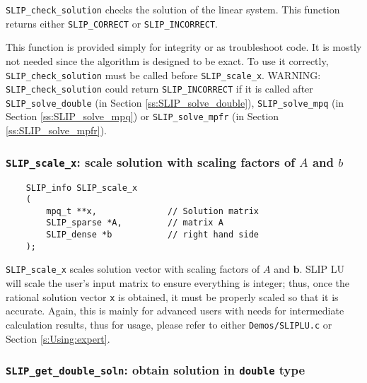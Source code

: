 \documentclass[12pt]{article}
\theoremstyle{definition}
\begin{document}
\verb|SLIP_check_solution| checks the solution of the linear system. This
function returns either \verb|SLIP_CORRECT| or \verb|SLIP_INCORRECT|.

This function is provided simply for integrity or as troubleshoot code. It is
mostly not needed since the algorithm is designed to be exact. To use it
correctly, \verb|SLIP_check_solution| must be called before
\verb|SLIP_scale_x|. WARNING: \verb|SLIP_check_solution| could return
\verb|SLIP_INCORRECT| if it is called after \verb|SLIP_solve_double| (in
Section \ref{ss:SLIP_solve_double}), \verb|SLIP_solve_mpq| (in Section
\ref{ss:SLIP_solve_mpq}) or \verb|SLIP_solve_mpfr| (in Section
\ref{ss:SLIP_solve_mpfr}).


\cprotect\subsubsection{\verb|SLIP_scale_x|: scale solution with scaling factors of $A$ and $b$}
\label{ss:SLIP_scale_x}

\begin{mdframed}[userdefinedwidth=6in]
{\footnotesize
\begin{verbatim}
    SLIP_info SLIP_scale_x
    (
        mpq_t **x,              // Solution matrix
        SLIP_sparse *A,         // matrix A
        SLIP_dense *b           // right hand side
    );
\end{verbatim}
} \end{mdframed}

\verb|SLIP_scale_x| scales solution vector with scaling factors of $A$ and
$\mathbf{b}$. SLIP LU will scale the user's input matrix to ensure everything
is integer; thus, once the rational solution vector \verb|x| is obtained, it
must be properly scaled so that it is accurate. Again, this is mainly for
advanced users with needs for intermediate calculation results, thus for usage,
please refer to either \verb|Demos/SLIPLU.c| or Section \ref{s:Using:expert}.

\cprotect\subsubsection{\verb|SLIP_get_double_soln|: obtain solution in \verb|double| type}
\label{ss:get_double_soln}
\end{document}
